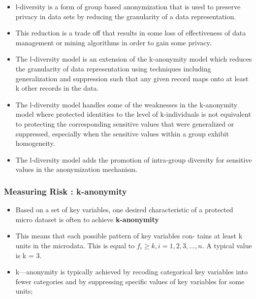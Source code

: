 \documentclass{beamer}
\begin{document}
\begin{frame}
\begin{itemize}
	\item l-diversity is a form of group based anonymization that is used to preserve privacy in data sets by reducing the granularity of a data representation.
	\item This reduction is a trade off that results in some loss of effectiveness of data management or mining algorithms in order to gain some privacy. 
	\item The l-diversity model is an extension of the k-anonymity model which reduces the granularity of data representation using techniques including generalization and suppression such that any given record maps onto at least k other records in the data. 
	\end{itemize}
\end{frame}

\begin{frame}
	\begin{itemize}	\item The l-diversity model handles some of the weaknesses in the k-anonymity model where protected identities to the level of k-individuals is not equivalent to protecting the corresponding sensitive values that were generalized or suppressed, especially when the sensitive values within a group exhibit homogeneity. 
	\item The l-diversity model adds the promotion of intra-group diversity for sensitive values in the anonymization mechanism.
\end{itemize}
\end{frame}
	\begin{frame}
		\frametitle{Measuring Risk : k-anonymity}
		\begin{itemize}
			\item Based on a set of key variables, one desired characteristic of a protected micro
			dataset is often to achieve \textbf{k-anonymity} 
			\item This means that each possible pattern of key variables con-
			tains at least k units in the microdata. This is equal to $f_i \geq k, i=1,2,3,\ldots ,n$.  A
			typical value is k = 3.
			\item k—anonymity is typically achieved by recoding categorical key variables into fewer
			categories and by suppressing speciﬁc values of key variables for some units;
		\end{itemize}
	\end{frame}
	
\end{document}
